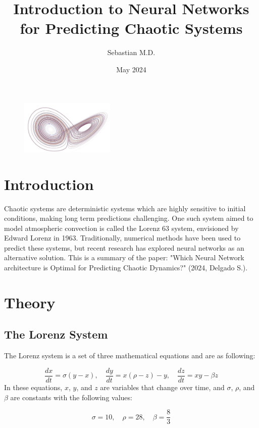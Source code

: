 \documentclass[11pt]{article}
\title{Introduction to Neural Networks for Predicting Chaotic Systems}
\author{Sebastian M.D.}
\date{May 2024}
\begin{document}
\maketitle

\begin{figure}[h]
\centering
\includegraphics[width=0.4\textwidth]{title_page_image.jpeg}
\end{figure}

\section{Introduction}

Chaotic systems are deterministic systems which are highly sensitive to initial conditions, making long term predictions challenging. One such system aimed to model atmospheric convection is called the Lorenz 63 system, envisioned by Edward Lorenz in 1963. Traditionally, numerical methods have been used to predict these systems, but recent research has explored neural networks as an alternative solution. This is a summary of the paper: "Which Neural Network architecture is Optimal for Predicting Chaotic Dynamics?" (2024, Delgado S.).

\section{Theory}

\subsection{The Lorenz System}
The Lorenz system is a set of three mathematical equations and are as following:

\[
\frac{dx}{dt} = \sigma(y - x), \quad \frac{dy}{dt} = x(\rho - z) - y, \quad \frac{dz}{dt} = xy - \beta z
\]
In these equations, $x$, $y$, and $z$ are variables that change over time, and $\sigma$, $\rho$, and $\beta$ are constants with the following values:  

\[
\sigma = 10, \quad \rho = 28, \quad \beta = \frac{8}{3}
\]
\end{document}
